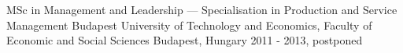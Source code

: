 


\begin{cventries}


  \cventry
    {MSc in Management and Leadership — Specialisation in Production and Service Management} %
    {Budapest University of Technology and Economics, Faculty of Economic and Social Sciences} %
    {Budapest, Hungary} %
    {2011 - 2013, postponed} %
    {
    }


\end{cventries}

